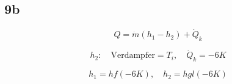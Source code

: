 \subsection*{9b}

\[
Q = \dot{m} (h_1 - h_2) + \dot{Q}_k
\]

\[
h_2: \quad \text{Verdampfer} = T_i, \quad \dot{Q}_k = -6K
\]

\[
h_1 = hf(-6K), \quad h_2 = hgl(-6K)
\]